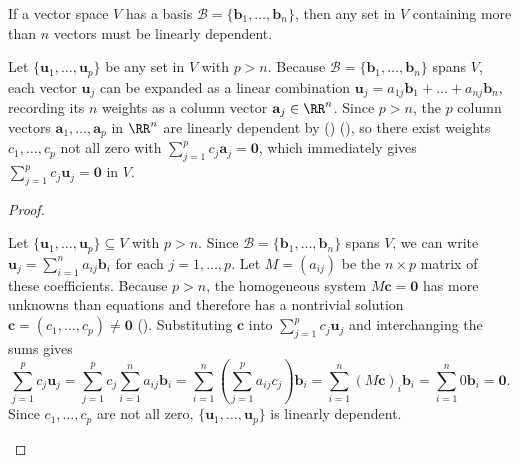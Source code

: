 \documentclass[10pt]{scrartcl}
\newcommand{\vv}[1]{\mathbf{#1}}
\begin{document}
\begin{theorem*}
  If a vector space $V$ has a basis $\mathcal{B}=\{\vv b_1,\dots,\vv b_n\}$, then any set in $V$ containing more than $n$ vectors must be linearly dependent.
\end{theorem*}
\begin{ideabox}
  Let $\{\vv u_1,\dots,\vv u_p\}$ be any set in $V$ with $p>n$. Because $\mathcal{B}=\{\vv b_1,\dots,\vv b_n\}$ spans $V$, each vector $\vv u_j$ can be expanded as a linear combination $\vv u_j=a_{1j}\vv b_1+\dots+a_{nj}\vv b_n$, recording its $n$ weights as a column vector $\vv a_j\in\RR^n$. Since $p>n$, the $p$ column vectors $\vv a_1,\dots,\vv a_p$ in $\RR^n$ are linearly dependent by () (), so there exist weights $c_1,\dots,c_p$ not all zero with $\sum_{j=1}^p c_j\vv a_j=\vv 0$, which immediately gives $\sum_{j=1}^p c_j\vv u_j=\vv 0$ in $V$.
\end{ideabox}
\begin{proof}
  \begin{steps}
    \ii Let $\{\vv u_1,\dots,\vv u_p\}\subseteq V$ with $p>n$. Since $\mathcal{B}=\{\vv b_1,\dots,\vv b_n\}$ spans $V$, we can write $\vv u_j=\sum_{i=1}^n a_{ij}\vv b_i$ for each $j=1,\dots,p$. Let $M=(a_{ij})$ be the $n\times p$ matrix of these coefficients.
    \ii Because $p>n$, the homogeneous system $M\vv c=\vv 0$ has more unknowns than equations and therefore has a nontrivial solution $\vv c=(c_1,\dots,c_p)\ne\vv 0$ ().
    \ii Substituting $\vv c$ into $\sum_{j=1}^p c_j\vv u_j$ and interchanging the sums gives
    \[
      \sum_{j=1}^p c_j\vv u_j = \sum_{j=1}^p c_j\sum_{i=1}^n a_{ij}\vv b_i = \sum_{i=1}^n \left(\sum_{j=1}^p a_{ij}c_j\right)\vv b_i = \sum_{i=1}^n (M\vv c)_i\vv b_i = \sum_{i=1}^n 0\vv b_i = \vv 0.
    \]
    Since $c_1,\dots,c_p$ are not all zero, $\{\vv u_1,\dots,\vv u_p\}$ is linearly dependent.
  \end{steps}
\end{proof}
\end{document}
